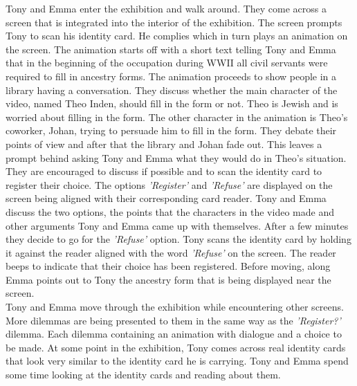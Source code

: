 Tony and Emma enter the exhibition and walk around. They come across a screen that is integrated into the interior of the exhibition. The screen prompts Tony to scan his identity card. He complies which in turn plays an animation on the screen. The animation starts off with a short text telling Tony and Emma that in the beginning of the occupation during WWII all civil servants were required to fill in ancestry forms. The animation proceeds to show people in a library having a conversation. They discuss whether the main character of the video, named Theo Inden, should fill in the form or not. Theo is Jewish and is worried about filling in the form. The other character in the animation is Theo's coworker, Johan, trying to persuade him to fill in the form. They debate their points of view and after that the library and Johan fade out. This leaves a prompt behind asking Tony and Emma what they would do in Theo's situation. They are encouraged to discuss if possible and to scan the identity card to register their choice. The options \textit{'Register'} and \textit{'Refuse'} are displayed on the screen being aligned with their corresponding card reader. Tony and Emma discuss the two options, the points that the characters in the video made and other arguments Tony and Emma came up with themselves. After a few minutes they decide to go for the \textit{'Refuse'} option. Tony scans the identity card by holding it against the reader aligned with the word \textit{'Refuse'} on the screen. The reader beeps to indicate that their choice has been registered. Before moving, along Emma points out to Tony the ancestry form that is being displayed near the screen. \\

Tony and Emma move through the exhibition while encountering other screens. More dilemmas are being presented to them in the same way as the \textit{'Register?'} dilemma. Each dilemma containing an animation with dialogue and a choice to be made. At some point in the exhibition, Tony comes across real identity cards that look very similar to the identity card he is carrying. Tony and Emma spend some time looking at the identity cards and reading about them.\\

